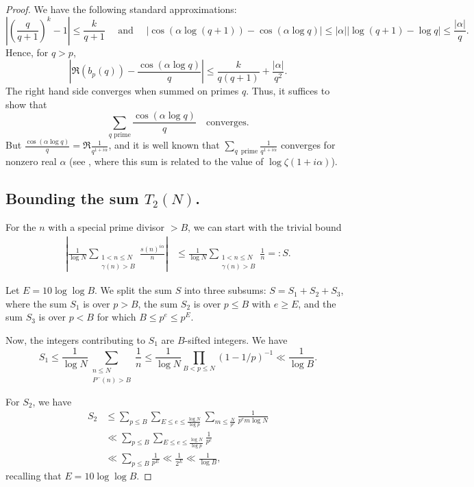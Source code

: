 \documentclass[11pt, reqno]{amsart}
\theoremstyle{remark}
\numberwithin{theorem}{section}
\numberwithin{proposition}{section}
\numberwithin{lemma}{section}
\numberwithin{corollary}{section}
\numberwithin{equation}{section}
\numberwithin{conjecture}{section}
\numberwithin{definition}{section}
\begin{document}
\begin{proof}
We have the following standard approximations:
$$
\left | \left (\frac{q}{q+1}\right )^k -1\right |\le \frac{k}{q+1}\quad\text{ and }\quad
\left |
\cos (\alpha \log (q+1))-
\cos (\alpha\log q)\right |
\le |\alpha| |\log (q+1) -\log q|\le \frac{|\alpha|}{q}.
$$
Hence, for $q>p$,
\[ \left|\Re(b_p(q)) -\frac{\cos(\alpha\log{q})}{q}\right| \le \frac{k}{q(q+1)} + \frac{|\alpha|}{q^2}. \]
The right hand side converges when summed on primes $q$. Thus, it suffices to show that
\[ \sum_{q\text{ prime}} \frac{\cos(\alpha\log{q})}{q} \quad\text{converges}. \]
But $\frac{\cos(\alpha\log{q})}{q} = \Re\frac{1}{q^{1+i\alpha}}$, and it is well known that $\sum_{q\,\text{ prime}} \frac{1}{q^{1+i\alpha}}$ converges for nonzero real $\alpha$ (see \cite[pp. 65-66]{Titchmarsh}, where this sum is related to the value of $\log \zeta(1+i\alpha)$). 













\subsection{\bf Bounding the sum $T_2 (N)$.}

For the $n$ with a  special prime divisor $> B$, we can start with the trivial bound
\begin{equation*}
\begin{split}
\left |
\frac{1}{\log N}
\sum_{
\substack{{1<n\le N}\\
{\gamma (n)>B}}}
\frac{s(n)^{i\alpha}}{n}
\right |
&\le 
\frac{1}{\log N}
\sum_{
\substack{{1<n\le N}\\
{\gamma (n)>B}}}
\frac{1}{n}=: S.
\end{split}
\end{equation*}
 
Let $E = 10\log\log{B}$. We split the sum $S$ into three subsums: $S=S_1+S_2+S_3$, where the sum $S_1$ is over $p>B$, the sum $S_2$ is over $p\le B$ with $e\ge E$, and the sum 
$S_3$ is over $p<B$ for which $B\le p^e\le p^E$.


Now, the integers contributing to $S_1$ are $B$-sifted integers. We have
$$S_1  \le \frac{1}{\log N}\sum_{\substack{{n\le N}\\ {P^-(n)>B}}}\frac{1}{n} \le\frac{1}{\log{N}} \prod_{B < p \le N} (1-1/p)^{-1} \ll \frac{1}{\log{B}}.$$


 For $S_2$, we have
\begin{equation*}
\begin{split}
S_2 &\le \sum_{p\le B}
\sum_{E\le e\le \frac{\log N}{\log p}}
\sum_{m\le \frac{N}{p^e}}
\frac{1}{p^em\log N}\\
&\ll
\sum_{p\le B}\sum_{E\le e\le\frac{\log N}{\log p}}\frac{1}{p^e}\\
&\ll \sum_{p\le B}\frac{1}{p^E}\ll \frac{1}{2^E}\ll \frac{1}{\log B},
\end{split}
\end{equation*} 
recalling that $E=10\log\log B$.


\end{proof}
\end{document}
